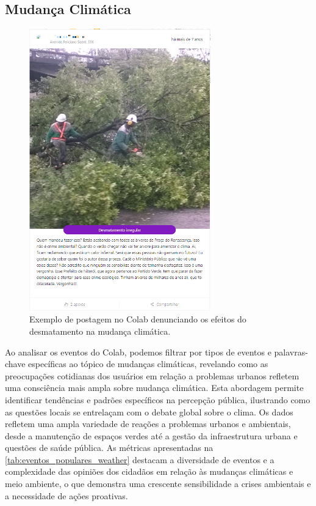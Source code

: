\subsection{Mudança Climática}
\label{sec:eventos_populares_weather}

\begin{figure}[htb]
	\centering
	\includegraphics[width=0.7\textwidth]{images/colab_posts_social_clima.png}
	\caption{Exemplo de postagem no Colab denunciando os efeitos do desmatamento na mudança climática.}
	\label{fig:colab_posts_social_clima}
\end{figure}

Ao analisar os eventos do Colab, podemos filtrar por tipos de eventos e palavras-chave específicas ao tópico de mudanças climáticas, revelando como as preocupações cotidianas dos usuários em relação a problemas urbanos refletem uma consciência mais ampla sobre mudança climática. Esta abordagem permite identificar tendências e padrões específicos na percepção pública, ilustrando como as questões locais se entrelaçam com o debate global sobre o clima. Os dados refletem uma ampla variedade de reações a problemas urbanos e ambientais, desde a manutenção de espaços verdes até a gestão da infraestrutura urbana e questões de saúde pública. As métricas apresentadas na \autoref{tab:eventos_populares_weather} destacam a diversidade de eventos e a complexidade das opiniões dos cidadãos em relação às mudanças climáticas e meio ambiente, o que demonstra uma crescente sensibilidade a crises ambientais e a necessidade de ações proativas.

